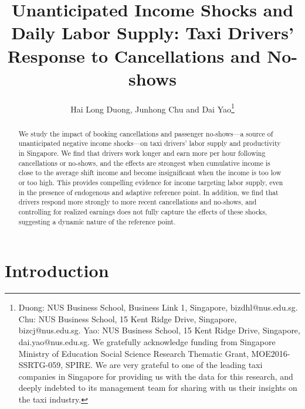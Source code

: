 \documentclass[reviewmode,AEJ]{AEA}
\begin{document}

\title{Unanticipated Income Shocks and Daily Labor Supply: Taxi Drivers' Response to Cancellations and No-shows}
\author{Hai Long Duong, Junhong Chu and Dai Yao\thanks{Duong: NUS Business School, Business Link 1, Singapore, bizdhl@nus.edu.sg. Chu: NUS Business School, 15 Kent Ridge Drive, Singapore, bizcj@nus.edu.sg. Yao: NUS Business School, 15 Kent Ridge Drive, Singapore, dai.yao@nus.edu.sg. We gratefully acknowledge funding from Singapore Ministry of Education Social Science Research Thematic Grant, MOE2016-SSRTG-059, SPIRE. We are very grateful to one of the leading taxi companies in Singapore for providing us with the data for this research, and deeply indebted to its management team for sharing with us their insights on the taxi industry.}}


\begin{abstract}
	We study the impact of booking cancellations and passenger no-shows---a source of unanticipated negative 
	income shocks---on taxi drivers' labor supply and productivity in Singapore. We find that 
	drivers work longer and earn more per hour following cancellations or no-shows, and the 
    effects are strongest when cumulative income is close to the average shift income and become 
    insignificant when the income is too low or too high. This provides 
	compelling evidence for income targeting labor supply, even in the presence of endogenous and adaptive 
	reference point. In addition, we find that drivers respond more strongly to more recent 
	cancellations and no-shows, and controlling for realized earnings does not fully capture the effects of these shocks,
	suggesting a dynamic nature of the reference point. 
\end{abstract}

\maketitle

\section{Introduction}
\end{document}

